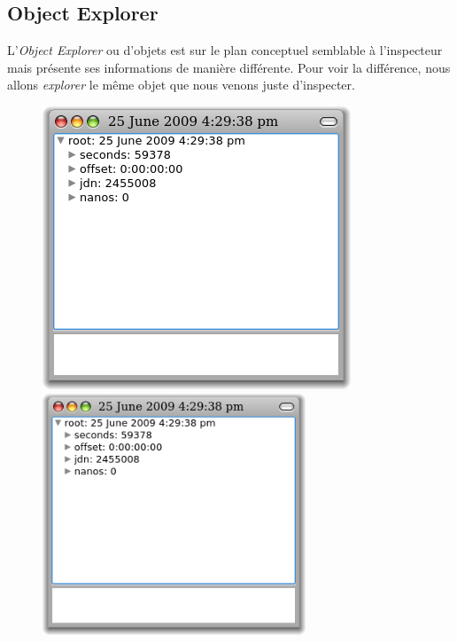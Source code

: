 \documentclass[a4paper,10pt,twoside]{book}
\begin{document}
\subsection{Object Explorer}

L'\emph{Object Explorer} ou  d'objets est sur le plan
conceptuel semblable à l'inspecteur mais présente ses informations
de manière différente.
Pour voir la différence, nous allons \emph{explorer} le même objet
que nous venons juste d'inspecter.

\begin{figure}[tbp]
\begin{minipage}{0.48\textwidth}
	\begin{center}
	\ifluluelse
		{\includegraphics[width=\textwidth]{exploreTimeStampNow}}
		{\includegraphics[width=0.7\textwidth]{exploreTimeStampNow}}

\end{center}
\end{minipage}
\end{figure}
\end{document}
